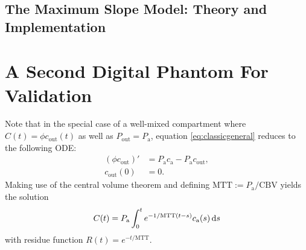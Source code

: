 \documentclass[paper=a4, fontsize=12pt,parskip=half, draft, headings=small]{scrartcl}
\newcommand{\ca}{c_\mathrm{a}}
\newcommand{\CBV}{\mathrm{CBV}}
\newcommand{\MTT}{\mathrm{MTT}}
\newcommand{\cout}{c_{\mathrm{out}}}
\newcommand{\Pa}{P_{\mathrm{a}}}
\newcommand{\Pout}{P_{\mathrm{out}}}
\begin{document}
	
	\subsection{The Maximum Slope Model: Theory and Implementation}\label{sec:ms}	
	
	
	
	
	
	\section{A Second Digital Phantom For Validation} \label{eq:comp}
	Note that in the special case of a well-mixed compartment where $C(t) = \phi\cout(t)$ as well as $\Pout=\Pa$, equation \eqref{eq:classicgeneral} reduces to the following ODE:
	\begin{align*}
		(\phi \cout)' &= \Pa \ca - \Pa \cout, \\
		\cout(0)&=0.
	\end{align*}
	Making use of the central volume theorem \cite{sourbron13} and defining $\MTT:=\Pa/\CBV$ yields the solution
	\[
		C(t) = \Pa \int_0^t e^{-1/\MTT(t-s)}\ca(s)\diffint s
	\]
	with residue function $R(t)=e^{-t/\MTT}$. 



		
	

	
\end{document}
